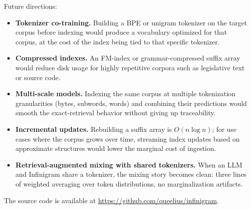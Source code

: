 \documentclass[11pt]{article}
\begin{document}
Future directions:

\begin{itemize}
    \item \textbf{Tokenizer co-training.} Building a BPE or unigram tokenizer on the target corpus before indexing would produce a vocabulary optimized for that corpus, at the cost of the index being tied to that specific tokenizer.
    \item \textbf{Compressed indexes.} An FM-index or grammar-compressed suffix array would reduce disk usage for highly repetitive corpora such as legislative text or source code.
    \item \textbf{Multi-scale models.} Indexing the same corpus at multiple tokenization granularities (bytes, subwords, words) and combining their predictions would smooth the exact-retrieval behavior without giving up traceability.
    \item \textbf{Incremental updates.} Rebuilding a suffix array is $O(n \log n)$; for use cases where the corpus grows over time, streaming index updates based on approximate structures would lower the marginal cost of ingestion.
    \item \textbf{Retrieval-augmented mixing with shared tokenizers.} When an LLM and Infinigram share a tokenizer, the mixing story becomes clean: three lines of weighted averaging over token distributions, no marginalization artifacts.
\end{itemize}

The source code is available at \url{https://github.com/queelius/infinigram}.



\end{document}
